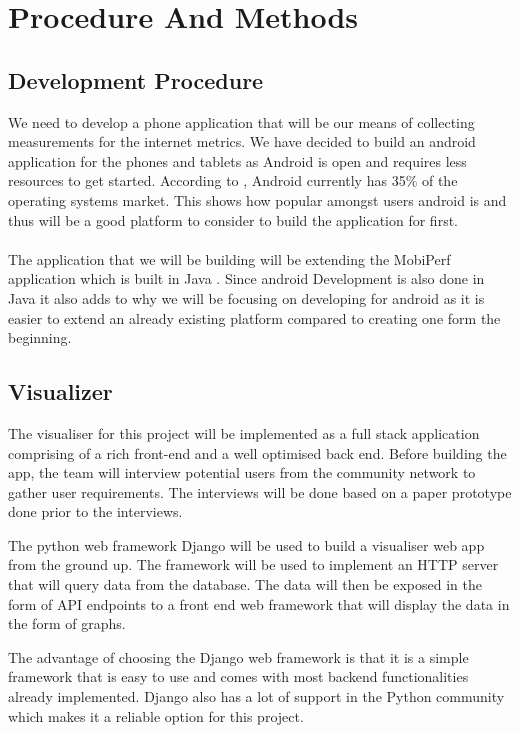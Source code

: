 \section{Procedure And Methods}
\subsection{Development Procedure}
We need to develop a phone application that will be our means of collecting measurements for the internet metrics. We have decided to build an android application for the phones and tablets as Android is open and requires less resources to get started. According to \cite{statcounter_global_stats}, Android currently has 35\% of the operating systems market. This shows how popular amongst users android is and thus will be a good platform to consider to build the application for first. 
\paragraph{}
The application that we will be building will be extending the MobiPerf application which is built in Java \cite{m-lab}. Since android Development is also done in Java it also adds to why we will be focusing on developing for android as it is easier to extend an already existing platform compared to creating one form the beginning.
\subsection{Visualizer}
The visualiser for this project will be implemented as a full stack application comprising of a rich front-end and a well optimised back end. Before building the app, the team will interview potential users from the community network to gather user requirements. The interviews will be done based on a paper prototype done prior to the interviews.

The python web framework Django will be used to build a visualiser web app from the ground up. The framework will be used to implement an HTTP server that will query data from the database. The data will then be exposed in the form of API endpoints to a front end web framework that will display the data in the form of graphs.

The advantage of choosing the Django web framework is that it is a simple framework that is easy to use and comes with most backend functionalities already implemented. Django also has a lot of support in the Python community which makes it a reliable option for this project.

